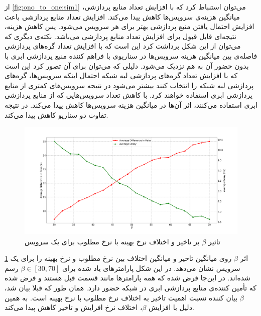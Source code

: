    از \cref{fig:ono_to_one:sim1} می‌توان استنباط کرد که با افزایش تعداد منابع پردازشی، میانگین هزینه‌ی سرویس‌ها کاهش پیدا می‌کند.
    افزایش تعداد منابع پردازشی باعث افزایش احتمال یافتن منبع پردازشی بهتر برای هر سرویس می‌شود.
    پس کاهش هزینه، نتیجه‌ای قابل قبول برای افزایش تعداد منابع پردازشی می‌باشد.
    نکته‌ی دیگری که می‌توان از این شکل برداشت کرد این است که با افزایش تعداد گره‌های پردازشی فاصله‌ی بین میانگین هزینه سرویس‌ها در سناریو‌ی با فراهم کننده منبع پردازشی ابری با بدون حضور آن به هم نزدیک می‌شود.
    دلیلی که می‌توان برای آن تصور کرد این است که با افزایش تعداد گره‌های پردازشی لبه شبکه احتمال اینکه سرویس‌ها، گره‌های پردازشی لبه شبکه را انتخاب کنند بیشتر می‌شود در نتیجه سرویس‌های کمتری از منابع پردازشی ابری استفاده خواهند کرد.
    با کاهش تعداد سرویس‌هایی که از منابع پردازشی ابری استفاده می‌کنند، اثر آن‌ها در میانگین هزینه سرویس‌ها کاهش پیدا می‌کند.
    در نتیجه تفاوت دو سناریو کاهش پیدا می‌کند.

    \begin{figure}
      \centerline{\includegraphics[width=17cm]{graphics/one_to_one/sim_2}}
      \caption{تاثیر $\beta$ بر تاخیر و اختلاف نرخ بهینه با نرخ مطلوب برای یک سرویس}
      \label{fig:ono_to_one:sim2}
    \end{figure}

    \cref{fig:ono_to_one:sim2} اثر $\beta$ روی میانگین تاخیر و میانگین اختلاف بین نرخ مطلوب و نرخ بهینه را برای یک سرویس نشان می‌دهد.
    در این شکل پارامتر‌های یاد شده برای $\beta \in [30, 70]$ رسم شده‌اند.
    در این‌جا فرض شده که همه پارامتر‌ها مانند قسمت قبل هستند و فرض شده که تأمین کننده‌ی منابع پردازشی ابری در شبکه حضور دارد.
    همان طور که قبلا بیان شد، $\beta$ بیان کننده نسبت اهمیت تاخیر به اختلاف نرخ مطلوب با نرخ بهینه است.
    به همین دلیل با افزایش $\beta$، اختلاف نرخ افرایش و تاخیر کاهش پیدا می‌کند.
    

